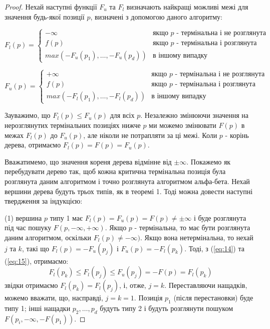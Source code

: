 \documentclass[12pt,a4paper]{article}
\begin{document}
\begin{proof}
  Нехай наступні функції $F_u$ та $F_l$ визначають найкращі можливі межі для
  значення будь-якої позиції $p$, визначені з допомогою даного алгоритму:

  \begin{equation}
    \label{eq:14}
    F_l(p) =
    \begin{cases}
      -\infty & \textit{якщо $p$ - термінальна і не розглянута}\\
      f(p) & \textit{якщо $p$ - термінальна і розглянута}\\
      max(-F_u(p_1),\dots,-F_u(p_d)) & \textit{в іншому випадку}
    \end{cases}
  \end{equation}

  \begin{equation}
    \label{eq:15}
    F_u(p) =
    \begin{cases}
      +\infty & \textit{якщо $p$ - термінальна і не розглянута}\\
      f(p) & \textit{якщо $p$ - термінальна і розглянута}\\
      max(-F_l(p_1),\dots,-F_l(p_d)) & \textit{в іншому випадку}
    \end{cases}
  \end{equation}

  Зауважимо, що $F_l(p) \le F_u(p)$ для всіх $p$. Незалежно змінюючи значення
  на нерозглянутих термінальних позиціях нижче $p$ ми можемо змінювати $F(p)$
  в межах $F_l(p)$ до $F_u(p)$, але ніколи не потрапляти за ці межі. Коли $p$
  - корінь дерева, отримаємо $F_l(p)=F(p)=F_u(p)$.

  Вважатимемо, що значення кореня дерева відмінне від $\pm\infty$. Покажемо як
  перебудувати дерево так, щоб кожна критична термінальна позиція була
  розглянута даним алгоритмом і точно розглянута алгоритмом альфа-бета. Нехай
  вершини дерева будуть трьох типів, як в теоремі 1. Тоді можна довести
  наступні твердження за індукцією:

  (1) вершина $p$ типу 1 має $F_l(p)=F_u(p)=F(p)\ne\pm\infty$ і буде
  розглянута під час пошуку $F(p, -\infty, +\infty)$. Якщо $p$ - термінальна,
  то має бути розглянута даним алгоритмом, оскільки $F_l(p)\ne-\infty)$. Якщо
  вона нетермінальна, то нехай $j$ та $k$, такі що $F_l(p)=-F_u(p_j)$ і
  $F_u(p)=-F_l(p_k)$. Тоді, з (\ref{eq:14}) та (\ref{eq:15}), отримаємо:
  \begin{equation*}
    F_l(p_k)\le F_l(p_j)\le F_u(p_j)=-F(p)=F_l(p_k)
  \end{equation*}
  звідки отримаємо $F_l(p_k)=F_l(p_j)$, і, отже, $j=k$. Переставляючи
  нащадків, можемо вважати, що, насправді, $j=k=1$. Позиція $p_1$ (після
  перестановки) буде типу 1; інші нащадки $p_2,\dots,p_d$ будуть типу 2 і
  будуть розглянути пошуком $F(p_i, -\infty, -F(p_1))$.


\end{proof}
\end{document}
